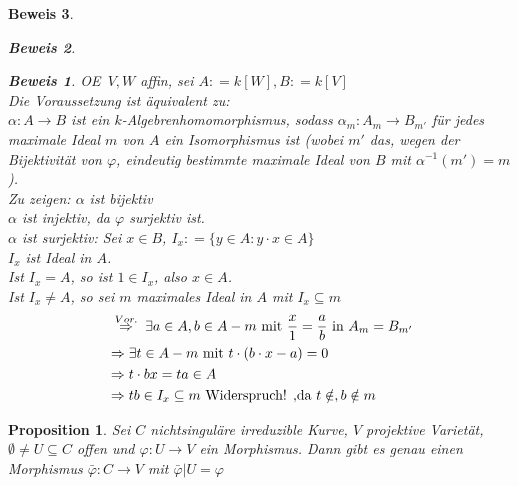 \documentclass[a4paper,12pt]{report}
\theoremstyle{break}
\newtheorem{Prop}[Def]{Proposition}
\theoremstyle{nonumberbreak}
\theoremstyle{nonumberplain}
\newtheorem{Bew}{Beweis}
\newcommand{\defeqr}[0]{\mathrel{\mathop:}=}
\newcommand{\folgtwegen}[1]{\ensuremath{\DOTSB\;\stackrel{#1}{\Rightarrow}\;}}
\renewcommand{\OE}{O\!\!E~}
\begin{document}
\begin{Bew}
\begin{Bew}
\begin{Bew}
      \OE $V,W$ affin, sei $A\defeqr k[W], B\defeqr k[V]$ \\
      Die Voraussetzung ist äquivalent zu: \\
      $\alpha:A\longrightarrow B$ ist ein $k$-Algebrenhomomorphismus, sodass $\alpha_m:A_m\longrightarrow B_{m'}$
      für jedes maximale Ideal $m$ von $A$ ein Isomorphismus ist (wobei $m'$ das, wegen der Bijektivität von $\varphi$,
      eindeutig bestimmte maximale Ideal von $B$ mit $\alpha^{-1}(m')=m$). \\
      Zu zeigen: $\alpha$ ist bijektiv \\
      $\alpha$ ist injektiv, da $\varphi$ surjektiv ist. \\
      $\alpha$ ist surjektiv: Sei $x\in B$, $I_x\defeqr\{y\in A:y\cdot x\in A\}$ \\
      $I_x$ ist Ideal in $A$. \\
      Ist $I_x=A$, so ist $1\in I_x$, also $x\in A$. \\
      Ist $I_x\neq A$, so sei $m$ maximales Ideal in $A$ mit $I_x\subseteq m$ \\
      \begin{align*}
        & \folgtwegen{Vor.} \exists a\in A, b\in A-m\text{ mit } \frac{x}{1}=\frac{a}{b}\text{ in }A_m=B_{m'} \\
        & \Rightarrow\exists t\in A-m\text{ mit }t\cdot(b\cdot x-a)=0 \\
        & \Rightarrow t\cdot bx=ta\in A \\
        & \Rightarrow tb\in I_x\subseteq m\text{ Widerspruch! ,da } t\notin,b\notin m
      \end{align*}
    \end{Bew}
  \end{Bew}
\end{Bew}
\begin{Prop}
  \label{prop:18.5}
  Sei $C$ nichtsinguläre irreduzible Kurve, $V$ projektive Varietät, $\emptyset\neq U\subseteq C$ offen
  und $\varphi:U\longrightarrow V$ ein Morphismus. Dann gibt es genau einen Morphismus $\bar{\varphi}:C\longrightarrow V$
  mit $\bar{\varphi}\vert U=\varphi$
\end{Prop}
\end{document}
